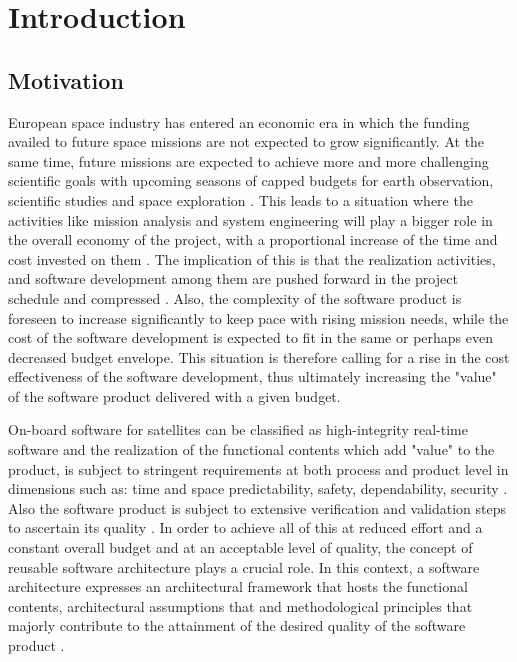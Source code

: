 
\chapter{Introduction}
\label{chap: Introduction}
\section{Motivation}
European space industry has entered an economic era in which the funding availed to future space missions are not expected to grow significantly. At the same time, future missions are expected to achieve more and more challenging scientific goals with upcoming seasons of capped budgets for earth observation, scientific studies and space exploration \cite{PhdThesis}. This leads to a situation where the activities like mission analysis and system engineering will play a bigger role in the overall economy of the project, with a proportional increase of the time and cost invested on them \cite{PhdThesis}. The implication of this is that the realization activities, and software development among them are pushed forward in the project schedule and compressed \cite{SAVOIR}. Also, the complexity of the software product is foreseen to increase significantly to keep pace with rising mission needs, while the cost of the software development is expected to fit in the same or perhaps even decreased budget envelope. This situation is therefore calling for a rise in the cost effectiveness of the software development, thus ultimately increasing the "value" of the software product delivered with a given budget.

On-board software for satellites can be classified as high-integrity real-time software and the realization of the functional contents which add "value" to the product, is subject to stringent requirements at both process and product level in dimensions such as: time and space predictability, safety, dependability, security \cite{PhdThesis}. Also the software product is subject to extensive verification and validation steps to ascertain its quality \cite{SAVOIR}. In order to achieve all of this at reduced effort and a constant overall budget and at an acceptable level of quality, the concept of reusable software architecture plays a crucial role. In this context, a software architecture expresses an architectural framework that hosts the functional contents, architectural assumptions that and methodological principles that majorly contribute to the attainment of the desired quality of the software product \cite{PhdThesis}.

